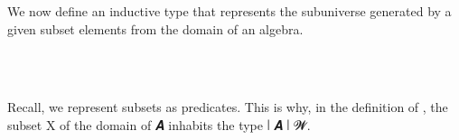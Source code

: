 We now define an inductive type  that represents the subuniverse generated by a given subset elements from the domain of an algebra.
\ccpad
\begin{code}%
\>[0][@{}l@{\AgdaIndent{1}}]%
\>[1]\AgdaSpace{}%
\AgdaSpace{}%
\AgdaSymbol{(}\AgdaSpace{}%
\AgdaSymbol{:}\AgdaSpace{}%
\AgdaSpace{}%
\AgdaSpace{}%
\AgdaSymbol{)(}\AgdaSpace{}%
\AgdaSymbol{:}\AgdaSpace{}%
\AgdaSpace{}%
\AgdaSpace{}%
\AgdaSpace{}%
\AgdaSpace{}%
\AgdaSymbol{)}\AgdaSpace{}%
\AgdaSymbol{:}\AgdaSpace{}%
\AgdaSpace{}%
\AgdaSpace{}%
\AgdaSpace{}%
\AgdaSpace{}%
\AgdaSymbol{(}\AgdaSpace{}%
\AgdaSpace{}%
\AgdaSpace{}%
\AgdaSpace{}%
\AgdaSpace{}%
\AgdaSpace{}%
\AgdaSymbol{)}\AgdaSpace{}%
\<%
\\
\>[1][@{}l@{\AgdaIndent{0}}]%
\>[2]\AgdaSpace{}%
\AgdaSymbol{:}\AgdaSpace{}%
\AgdaSpace{}%
\AgdaSymbol{\{}\AgdaSymbol{\}}\AgdaSpace{}%
\AgdaSpace{}%
\AgdaSpace{}%
\AgdaSpace{}%
\AgdaSpace{}%
\AgdaSpace{}%
\AgdaSpace{}%
\AgdaSpace{}%
\AgdaSpace{}%
\AgdaSpace{}%
\<%
\\
%
\>[2]\AgdaSpace{}%
\AgdaSymbol{:}\AgdaSpace{}%
\AgdaSymbol{(}\AgdaSpace{}%
\AgdaSymbol{:}\AgdaSpace{}%
\AgdaSpace{}%
\AgdaSpace{}%
\AgdaSymbol{)(}\AgdaSpace{}%
\AgdaSymbol{:}\AgdaSpace{}%
\AgdaSpace{}%
\AgdaSpace{}%
\AgdaSpace{}%
\AgdaSpace{}%
\AgdaSpace{}%
\AgdaSpace{}%
\AgdaSpace{}%
\AgdaSymbol{)}\AgdaSpace{}%
\AgdaSpace{}%
\AgdaSpace{}%
\AgdaSpace{}%
\AgdaSpace{}%
\AgdaSpace{}%
\AgdaSpace{}%
\AgdaSpace{}%
\AgdaSpace{}%
\AgdaSymbol{(}\AgdaSpace{}%
\AgdaSpace{}%
\AgdaSymbol{)}\AgdaSpace{}%
\AgdaSpace{}%
\AgdaSpace{}%
\AgdaSpace{}%
\AgdaSpace{}%
\<%
\end{code}
\ccpad
Recall, we represent subsets as predicates. This is why, in the definition of , the subset \ab X of the domain of \ab 𝑨 inhabits the type  \af ∣ \ab 𝑨 \af ∣ 𝓦.

